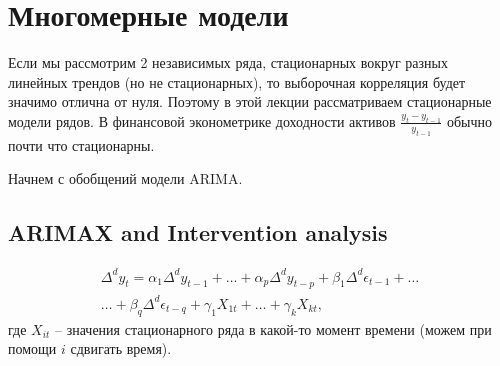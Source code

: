 \section{Многомерные модели}
    Если мы рассмотрим 2 независимых ряда, стационарных вокруг разных линейных 
    трендов (но не стационарных), то выборочная корреляция будет значимо отлична от нуля. 
    Поэтому в этой лекции рассматриваем стационарные модели рядов.
    В финансовой эконометрике доходности активов $\frac{y_t - y_{t-1}}{y_{t-1}}$ обычно почти что стационарны.

    Начнем с обобщений модели ARIMA.

    \subsection{ARIMAX and Intervention analysis}
        \begin{definition}
            \begin{multline}
                \Delta^d y_{t} =
                        \alpha_1 \Delta^d y_{t-1} + \dots + \alpha_p \Delta^d y_{t-p} + 
                        \beta_1 \Delta^d \epsilon_{t-1} + \dots \\ \dots + \beta_q \Delta^d \epsilon_{t-q} + 
                        \gamma_1 X_{1t} + \dots + \gamma_k X_{kt},
            \end{multline} 
            где $X_{it}$ -- значения стационарного ряда в какой-то момент времени (можем при помощи $i$ сдвигать время).
        \end{definition}

